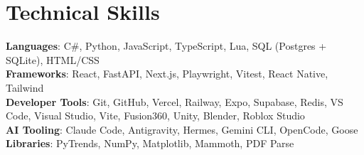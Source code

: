 \section{Technical Skills}
  \begin{itemize}[leftmargin=0.15in, label={}]
    \small{\item{
      \textbf{Languages}{: C\#, Python, JavaScript, TypeScript, Lua, SQL (Postgres + SQLite), HTML/CSS} \\
      \textbf{Frameworks}{: React, FastAPI, Next.js, Playwright, Vitest, React Native, Tailwind} \\
      \textbf{Developer Tools}{: Git, GitHub, Vercel, Railway, Expo, Supabase, Redis, VS Code, Visual Studio, Vite, Fusion360, Unity, Blender, Roblox Studio} \\
      \textbf{AI Tooling}{: Claude Code, Antigravity, Hermes, Gemini CLI, OpenCode, Goose} \\
      \textbf{Libraries}{: PyTrends, NumPy, Matplotlib, Mammoth, PDF Parse}
    }}
  \end{itemize}
